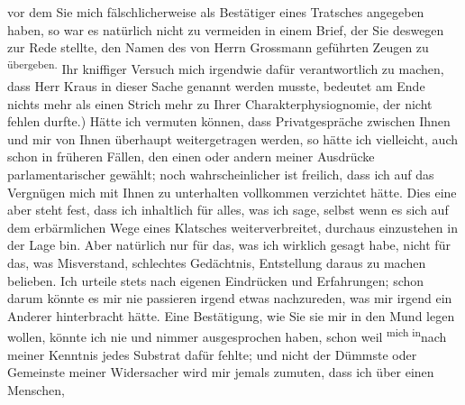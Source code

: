 \begin{ledgroupsized}[t]{13cm}
               vor dem Sie mich fälschlicherweise als Bestätiger eines Tratsches angegeben haben, so
               war es natürlich nicht zu vermeiden in einem Brief, der Sie deswegen zur Rede
               stellte, den Namen des von Herrn Grossmann
               geführten Zeugen zu \substVorne{}\textsuperscript{übergeben.}{\allowbreak}\substDazwischen{}\label{T_L02019_1v}\label{T_L02019_1h}\substHinten{}\pend
           \pstart
           Ihr kniffiger Versuch mich irgendwie dafür verantwortlich zu machen, dass Herr Kraus in dieser Sache genannt werden musste,
               bedeutet am Ende nichts mehr als einen Strich mehr zu Ihrer Charakterphysiognomie,
               der nicht fehlen durfte.) Hätte ich vermuten können, dass Privatgespräche zwischen
               Ihnen und mir von Ihnen überhaupt weitergetragen werden, so hätte ich vielleicht,
               auch schon in früheren Fällen, den einen oder
               andern meiner Ausdrücke parlamentarischer gewählt; noch wahrscheinlicher ist
               freilich, dass ich auf das Vergnügen mich mit Ihnen zu unterhalten vollkommen
               verzichtet hätte. Dies eine aber steht fest, dass ich inhaltlich für alles, was ich
               sage, selbst wenn es {\pb}sich auf dem erbärmlichen Wege eines
               Klatsches weiterverbreitet, durchaus einzustehen in der Lage bin. Aber natürlich nur
               für das, was ich wirklich gesagt habe, nicht für das, was Misverstand, schlechtes
               Gedächtnis, Entstellung daraus zu machen belieben. Ich urteile stets nach eigenen
               Eindrücken und Erfahrungen; schon darum könnte es mir nie passieren irgend etwas
               nachzureden, was mir irgend ein Anderer hinterbracht hätte. Eine Bestätigung, wie Sie
               sie mir in den Mund legen wollen, könnte ich nie und nimmer ausgesprochen haben,
               schon weil \substVorne{}\textsuperscript{mich in}{\allowbreak}\substDazwischen{}nach\substHinten{} meiner Kenntnis jedes Substrat dafür fehlte; und nicht der Dümmste oder
               Gemeinste meiner Widersacher wird mir jemals zumuten, dass ich über einen Menschen,

\end{ledgroupsized}
